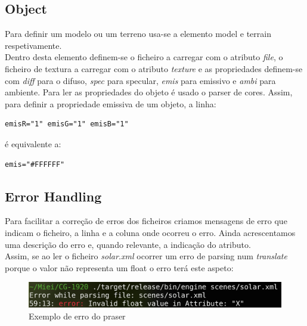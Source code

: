 \documentclass[a4paper]{report}
\begin{document}
\subsection{Object}
Para definir um modelo ou um terreno usa-se a elemento model e terrain
respetivamente.\\
Dentro desta elemento definem-se o ficheiro a carregar com o atributo \textit{file},
o ficheiro de textura a carregar com o atributo \textit{texture} e as
propriedades definem-se com \textit{diff} para o difuso, \textit{spec} para
specular, \textit{emis} para emissivo e \textit{ambi} para ambiente. Para ler as
propriedades do objeto é usado o parser de cores. Assim, para definir a
propriedade emissiva de um objeto, a linha:
\begin{lstlisting}
emisR="1" emisG="1" emisB="1"
\end{lstlisting}
é equivalente a:
\begin{lstlisting}
emis="#FFFFFF"
\end{lstlisting}

\subsection{Error Handling}
Para facilitar a correção de erros dos ficheiros criamos mensagens de erro que
indicam o ficheiro, a linha e a coluna onde ocorreu o erro. Ainda acrescentamos
uma descrição do erro e, quando relevante, a indicação do atributo.\\
Assim, se ao ler o ficheiro \textit{solar.xml} ocorrer um erro de parsing num
\textit{translate} porque o valor não representa um float o erro terá este
aspeto:
\begin{figure}[H]
    \centering 
    \includegraphics[width=\textwidth]{images/error_handling.png}  
    \caption{Exemplo de erro do praser}
\end{figure}
\end{document}
